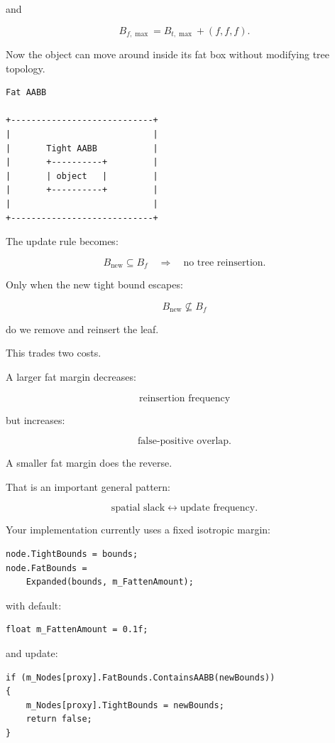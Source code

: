 and

\[
B_{f,\max}
=
B_{t,\max}+(f,f,f).
\]

Now the object can move around inside its fat box without modifying tree topology.

\begin{verbatim}
Fat AABB

+----------------------------+
|                            |
|       Tight AABB           |
|       +----------+         |
|       | object   |         |
|       +----------+         |
|                            |
+----------------------------+
\end{verbatim}

The update rule becomes:

\[
B_{\text{new}}\subseteq B_f
\quad\Longrightarrow\quad
\text{no tree reinsertion}.
\]

Only when the new tight bound escapes:

\[
B_{\text{new}}\not\subseteq B_f
\]

do we remove and reinsert the leaf.

This trades two costs.

A larger fat margin decreases:

\[
\text{reinsertion frequency}
\]

but increases:

\[
\text{false-positive overlap}.
\]

A smaller fat margin does the reverse.

That is an important general pattern:

\[
\boxed{
\text{spatial slack}
\leftrightarrow
\text{update frequency}.
}
\]

Your implementation currently uses a fixed isotropic margin:

\begin{verbatim}
node.TightBounds = bounds;
node.FatBounds =
    Expanded(bounds, m_FattenAmount);
\end{verbatim}

with default:

\begin{verbatim}
float m_FattenAmount = 0.1f;
\end{verbatim}

and update:

\begin{verbatim}
if (m_Nodes[proxy].FatBounds.ContainsAABB(newBounds))
{
    m_Nodes[proxy].TightBounds = newBounds;
    return false;
}
\end{verbatim}

